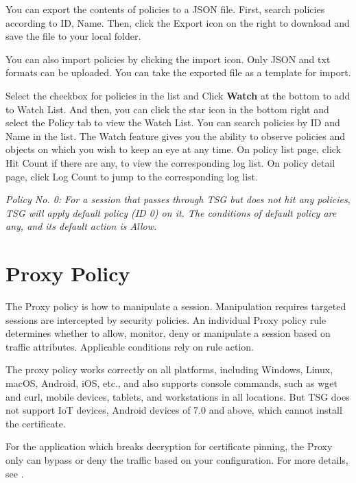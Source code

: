You can export the contents of policies to a JSON file. First, search policies according to ID, Name. Then, click the Export icon on the right to download and save the file to your local folder.


You can also import policies by clicking the import icon. Only JSON and txt formats can be uploaded. You can take the exported file as a template for import.


Select the checkbox for policies in the list and Click \textbf{Watch} at the bottom to add to Watch List. 
And then, you can click the star icon in the bottom right and select the Policy tab to view the Watch List. 
You can search policies by ID and Name in the list. The Watch feature gives you the ability to observe policies and objects on which you wish to keep an eye at any time. 
On policy list page, click Hit Count if there are any, to view the corresponding log list. On policy detail page, click Log Count to jump to the corresponding log list.


\notemark\textit{Policy No. 0: For a session that passes through TSG but does not hit any policies, TSG will apply default policy (ID 0) on it.
The conditions of default policy are any, and its default action is Allow. }

\section*{\hypertarget{link:Proxy Policy}{Proxy Policy}}
\label{sec:policies:proxy}

The Proxy policy is how to  manipulate a session. Manipulation requires targeted sessions are intercepted by security policies. 
An individual Proxy policy rule determines whether to allow, monitor, deny or manipulate a session based on traffic attributes. Applicable conditions rely on rule action.


The proxy policy works correctly on all platforms, including Windows, Linux, macOS, Android, iOS, etc., and also supports console commands, 
such as wget and curl, mobile devices, tablets, and workstations in all locations. But TSG does not support IoT devices, Android devices of 7.0 and above, which cannot install the certificate. 


For the application which breaks decryption for certificate pinning, the Proxy only can bypass or deny the traffic based on your configuration. 
For more details, see \hyperlink{link:Decryption}{\color{linkblue}{Decryption}}.

